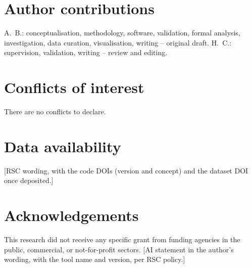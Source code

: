 \documentclass[10pt,a4paper]{article}
\begin{document}
\section*{Author contributions}
A.~B.: conceptualisation, methodology, software, validation, formal analysis,
investigation, data curation, visualisation, writing -- original draft. H.~C.:
supervision, validation, writing -- review and editing.

\section*{Conflicts of interest}
There are no conflicts to declare.

\section*{Data availability}
[RSC wording, with the code DOIs (version and concept) and the dataset DOI once deposited.]

\section*{Acknowledgements}
This research did not receive any specific grant from funding agencies in the public,
commercial, or not-for-profit sectors. [AI statement in the author's wording, with the
tool name and version, per RSC policy.]



\end{document}

